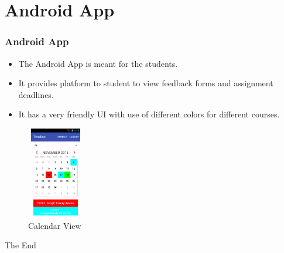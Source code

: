 \documentclass{beamer}
\begin{document}
\section{Android App}

\begin{frame}
\frametitle{Android App}
\begin{itemize}
\item The Android App is meant for the students.
\item It provides platform to student to view feedback forms and assignment deadlines.
\item It has a very friendly UI with use of different colors for different courses.
\end{itemize}
\begin{figure}[ht!]
    \centering
      \includegraphics[width=2.5cm,height=4cm]{images/calendarMix.png}
      \caption{Calendar View\label{overflow}}
  \end{figure}
\end{frame}

\begin{frame}
\Huge{\centerline{The End}}
\end{frame}

\end{document}
